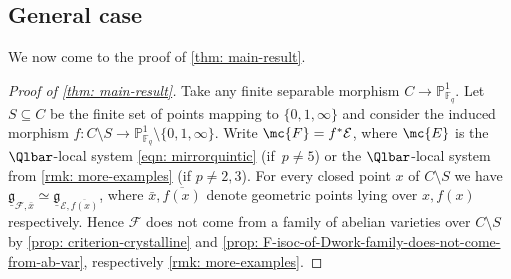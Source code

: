 \subsection{General case}
We now come to the proof of \cref{thm: main-result}.

\begin{proof}[Proof of \cref{thm: main-result}]
Take any finite separable morphism $C\to\mathbb{P}^1_{\mathbb{F}_q}$. Let $S\subseteq C$ be the finite set of points mapping to $\{0,1,\infty\}$ and consider the induced morphism $f\colon C\setminus S\to\mathbb{P}^1_{\mathbb{F}_q}\setminus\{0,1,\infty\}$. Write $\mc{F}=f^\ast\mathcal{E}$, where $\mc{E}$ is the $\Qlbar$-local system \eqref{eqn: mirrorquintic} (if~$p\neq 5$) or the $\Qlbar$-local system from \cref{rmk: more-examples} (if $p\neq 2,3$). For every closed point $x$ of $C\setminus S$ we have $\underline{\mathfrak{g}}_{\mathcal{F},\bar x}\simeq \underline{\mathfrak{g}}_{\mathcal{E},\overline{f(x)}}$, where $\bar x,\overline{f(x)}$ denote geometric points lying over $x,f(x)$ respectively. Hence $\mathcal{F}$ does not come from a family of abelian varieties over $C\setminus S$ by \cref{prop: criterion-crystalline} and \cref{prop: F-isoc-of-Dwork-family-does-not-come-from-ab-var}, respectively \cref{rmk: more-examples}.
\end{proof}

